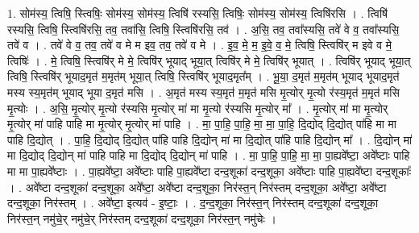 \documentclass[17pt]{extarticle}
\begin{document}
1. सोम॑स्य॒ त्विषि॒ स्त्विषिः॒ सोम॑स्य॒ सोम॑स्य॒ त्विषि॑ रस्यसि॒ त्विषिः॒ सोम॑स्य॒ सोम॑स्य॒ त्विषि॑रसि । . त्विषि॑ रस्यसि॒ त्विषि॒ स्त्विषि॑रसि॒ तव॒ तवा॑सि॒ त्विषि॒ स्त्विषि॑रसि॒ तव॑ । . अ॒सि॒ तव॒ तवा᳚स्यसि॒ तवे॑ वे व॒ तवा᳚स्यसि॒ तवे॑ व । . तवे॑ वे व॒ तव॒ तवे॑ व मे म इव॒ तव॒ तवे॑ व मे । . इ॒व॒ मे॒ म॒ इ॒वे॒ व॒ मे॒ त्विषि॒ स्त्विषि॑र् म इवे व मे॒ त्विषिः॑ । . मे॒ त्विषि॒ स्त्विषि॑र् मे मे॒ त्विषि॑र् भूयाद् भूया॒त् त्विषि॑र् मे मे॒ त्विषि॑र् भूयात् । . त्विषि॑र् भूयाद् भूया॒त् त्विषि॒ स्त्विषि॑र् भूयाद॒मृत॑ म॒मृत॑म् भूया॒त् त्विषि॒ स्त्विषि॑र् भूयाद॒मृत᳚म् । . भू॒या॒ द॒मृत॑ म॒मृत॑म् भूयाद् भूयाद॒मृत॑ मस्य स्य॒मृत॑म् भूयाद् भूया द॒मृत॑ मसि । . अ॒मृत॑ मस्य स्य॒मृत॑ म॒मृत॑ मसि मृ॒त्योर् मृ॒त्यो र॑स्य॒मृत॑ म॒मृत॑ मसि मृ॒त्योः । . अ॒सि॒ मृ॒त्योर् मृ॒त्यो र॑स्यसि मृ॒त्योर् मा॑ मा मृ॒त्यो र॑स्यसि मृ॒त्योर् मा᳚ । . मृ॒त्योर् मा॑ मा मृ॒त्योर् मृ॒त्योर् मा॑ पाहि पाहि मा मृ॒त्योर् मृ॒त्योर् मा॑ पाहि । . मा॒ पा॒हि॒ पा॒हि॒ मा॒ मा॒ पा॒हि॒ दि॒द्योद् दि॒द्योत् पा॑हि मा मा पाहि दि॒द्योत् । . पा॒हि॒ दि॒द्योद् दि॒द्योत् पा॑हि पाहि दि॒द्योन् मा॑ मा दि॒द्योत् पा॑हि पाहि दि॒द्योन् मा᳚ । . दि॒द्योन् मा॑ मा दि॒द्योद् दि॒द्योन् मा॑ पाहि पाहि मा दि॒द्योद् दि॒द्योन् मा॑ पाहि । . मा॒ पा॒हि॒ पा॒हि॒ मा॒ मा॒ पा॒ह्यवे᳚ष्टा॒ अवे᳚ष्टाः पाहि मा मा पा॒ह्यवे᳚ष्टाः । . पा॒ह्यवे᳚ष्टा॒ अवे᳚ष्टाः पाहि पा॒ह्यवे᳚ष्टा दन्द॒शूका॑ दन्द॒शूका॒ अवे᳚ष्टाः पाहि पा॒ह्यवे᳚ष्टा दन्द॒शूकाः᳚ । . अवे᳚ष्टा दन्द॒शूका॑ दन्द॒शूका॒ अवे᳚ष्टा॒ अवे᳚ष्टा दन्द॒शूका॒ निर॑स्त॒न् निर॑स्तम् दन्द॒शूका॒ अवे᳚ष्टा॒ अवे᳚ष्टा दन्द॒शूका॒ निर॑स्तम् । . अवे᳚ष्टा॒ इत्यव॑ - इ॒ष्टाः॒ । . द॒न्द॒शूका॒ निर॑स्त॒न् निर॑स्तम् दन्द॒शूका॑ दन्द॒शूका॒ निर॑स्त॒न् नमु॑चे॒र् नमु॑चे॒र् निर॑स्तम् दन्द॒शूका॑ दन्द॒शूका॒ निर॑स्त॒न् नमु॑चेः । \newline
\end{document}
